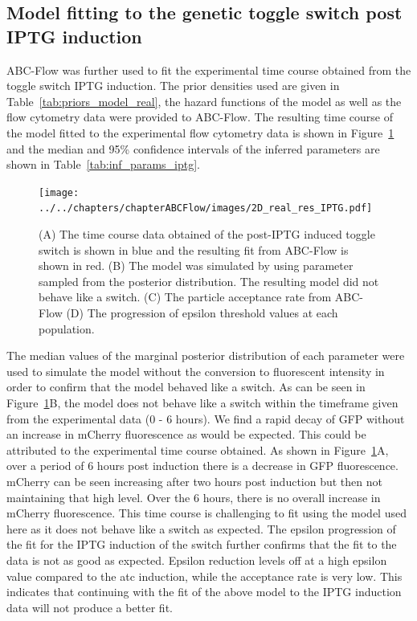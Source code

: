 \clearpage
\subsection{Model fitting to the genetic toggle switch post IPTG induction}
ABC-Flow was further used to fit the experimental time course obtained from the toggle switch IPTG induction. The prior densities used are given in Table~\ref{tab:priors_model_real}, the hazard functions of the model as well as the flow cytometry data were provided to ABC-Flow. The resulting time course of the model fitted to the experimental flow cytometry data is shown in Figure~\ref{fig:1d-real-res-iptg} and the median and 95\% confidence intervals of the inferred parameters are shown in Table~\ref{tab:inf_params_iptg}.


\begin{figure}[htbp]
\centerfloat%
	\texttt{[image: ../../chapters/chapterABCFlow/images/2D\_real\_res\_IPTG.pdf]}
	\caption[ABC-Flow fit to post-\acrshort{atc} time course data]{\label{fig:1d-real-res-iptg} (A) The time course data obtained of the post-IPTG induced toggle switch is shown in blue and the resulting fit from ABC-Flow is shown in red. (B) The model was simulated by using parameter sampled from the posterior distribution. The resulting model did not behave like a switch. (C) The particle acceptance rate from ABC-Flow (D) The progression of epsilon threshold values at each population.  }
\end{figure}

The median values of the marginal posterior distribution of each parameter were used to simulate the model without the conversion to fluorescent intensity in order to confirm that the model behaved like a switch. As can be seen in Figure~\ref{fig:1d-real-res-iptg}B, the model does not behave like a switch within the timeframe given from the experimental data (0 - 6 hours). We find a rapid decay of GFP without an increase in mCherry fluorescence as would be expected. This could be attributed to the experimental time course obtained. As shown in Figure~\ref{fig:1d-real-res-iptg}A, over a period of 6 hours post induction there is a decrease in GFP fluorescence. mCherry can be seen increasing after two hours post induction but then not maintaining that high level. Over the 6 hours, there is no overall increase in mCherry fluorescence. This time course is challenging to fit using the model used here as it does not behave like a switch as expected. The epsilon progression of the fit for the IPTG induction of the switch further confirms that the fit to the data is not as good as expected. Epsilon reduction levels off at a high epsilon value compared to the \acrshort{atc} induction, while the acceptance rate is very low. This indicates that continuing with the fit of the above model to the IPTG induction data will not produce a better fit.   


